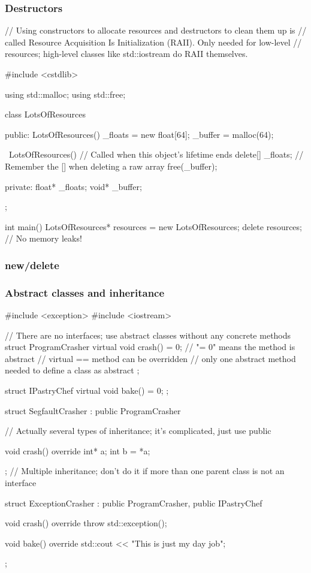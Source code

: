 \documentclass[glossy]{beamer}
\begin{document}
\begin{frame}[fragile=singleslide]
  \frametitle{Destructors}
  \begin{cppcode}
// Using constructors to allocate resources and destructors to clean them up is 
// called Resource Acquisition Is Initialization (RAII). Only needed for low-level 
// resources; high-level classes like std::iostream do RAII themselves. 

#include <cstdlib> 

using std::malloc;
using std::free;

class LotsOfResources {
  public:
    LotsOfResources() {
      _floats = new float[64];
      _buffer = malloc(64);
    }

    ~LotsOfResources() {
      // Called when this object's lifetime ends delete[] _floats;
      // Remember the [] when deleting a raw array free(_buffer);
    }

  private:
    float* _floats;
    void* _buffer;
};

int main() {
  LotsOfResources* resources = new LotsOfResources;
  delete resources; // No memory leaks!
}
  \end{cppcode}
\end{frame}

\begin{frame}[fragile=singleslide]
  \frametitle{new/delete}
  \begin{cppcode}
  \end{cppcode}
\end{frame}

\begin{frame}[fragile=singleslide]
  \frametitle{Abstract classes and inheritance}
  \begin{cppcode}
#include <exception> 
#include <iostream> 

// There are no interfaces; use abstract classes without any concrete methods 
struct ProgramCrasher { 
  virtual void crash() = 0; // "= 0" means the method is abstract 
  // virtual == method can be overridden 
  // only one abstract method needed to define a class as abstract
}; 

struct IPastryChef { 
  virtual void bake() = 0; 
};

struct SegfaultCrasher : public ProgramCrasher {
  // Actually several types of inheritance; it's complicated, just use public

  void crash() override {
    int* a;
    int b = *a;
  }
};
// Multiple inheritance; don't do it if more than one parent class is not an interface

struct ExceptionCrasher : public ProgramCrasher, public IPastryChef {
  void crash() override {
    throw std::exception();
  }

  void bake() override {
    std::cout << "This is just my day job\n";
  }
};
  \end{cppcode}
\end{frame}
\end{document}
